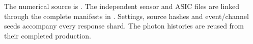 \documentclass[10pt,a4paper]{article}
\begin{document}
The numerical source is .
The independent sensor and ASIC files are linked through the complete manifests
in .
Settings, source hashes and event/channel seeds accompany every response shard.
The photon histories are reused from their completed production.
\end{document}
